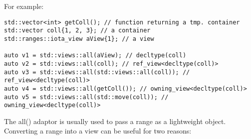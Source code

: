 For example:

\begin{lstlisting}[style=styleCXX]
std::vector<int> getColl(); // function returning a tmp. container
std::vector coll{1, 2, 3}; // a container
std::ranges::iota_view aView{1}; // a view

auto v1 = std::views::all(aView); // decltype(coll)
auto v2 = std::views::all(coll); // ref_view<decltype(coll)>
auto v3 = std::views::all(std::views::all(coll)); // ref_view<decltype(coll)>
auto v4 = std::views::all(getColl()); // owning_view<decltype(coll)>
auto v5 = std::views::all(std::move(coll)); // owning_view<decltype(coll)>
\end{lstlisting}

The all() adaptor is usually used to pass a range as a lightweight object. Converting a range into a view can be useful for two reasons:

